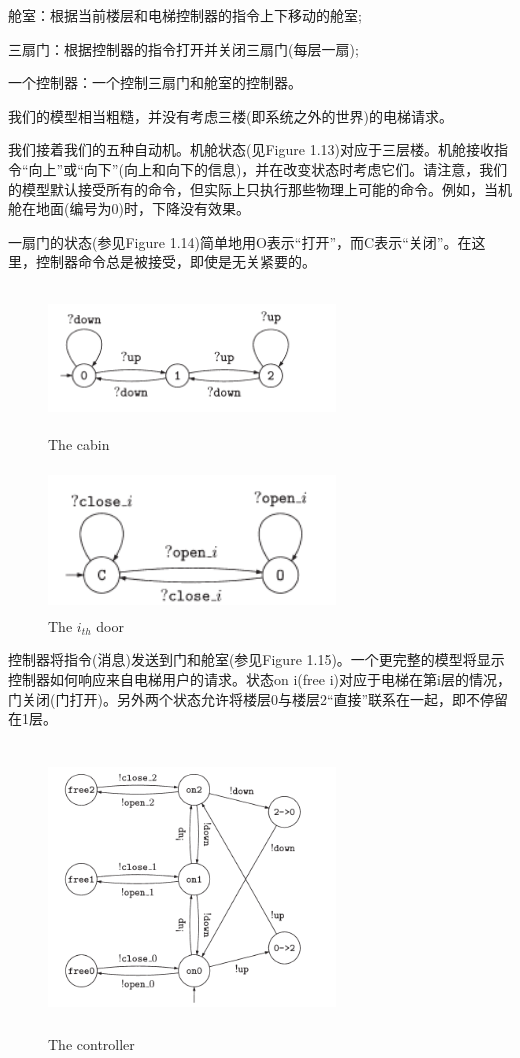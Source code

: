 \documentclass{book}
\begin{document}
    舱室：根据当前楼层和电梯控制器的指令上下移动的舱室;

    三扇门：根据控制器的指令打开并关闭三扇门(每层一扇);

    一个控制器：一个控制三扇门和舱室的控制器。

    我们的模型相当粗糙，并没有考虑三楼(即系统之外的世界)的电梯请求。

    我们接着我们的五种自动机。机舱状态(见Figure 1.13)对应于三层楼。机舱接收指令“向上”或“向下”(向上和向下的信息)，并在改变状态时考虑它们。请注意，我们的模型默认接受所有的命令，但实际上只执行那些物理上可能的命令。例如，当机舱在地面(编号为0)时，下降没有效果。

    一扇门的状态(参见Figure 1.14)简单地用O表示“打开”，而C表示“关闭”。在这里，控制器命令总是被接受，即使是无关紧要的。
    \begin{figure}
    \centering
    \includegraphics[height=1.5in,width=3.0in]{1_13.png}
    \caption{The cabin}
    \end{figure}
    \begin{figure}
    \centering
    \includegraphics[height=1.5in,width=3.0in]{1_14.png}
    \caption{The $i_{th}$ door}
    \end{figure}

    控制器将指令(消息)发送到门和舱室(参见Figure 1.15)。一个更完整的模型将显示控制器如何响应来自电梯用户的请求。状态on i(free i)对应于电梯在第i层的情况，门关闭(门打开)。另外两个状态允许将楼层0与楼层2“直接”联系在一起，即不停留在1层。
    \begin{figure}
    \centering
    \includegraphics[height=3.0in,width=3.0in]{1_15.png}
    \caption{The controller}
    \end{figure}
\end{document}
